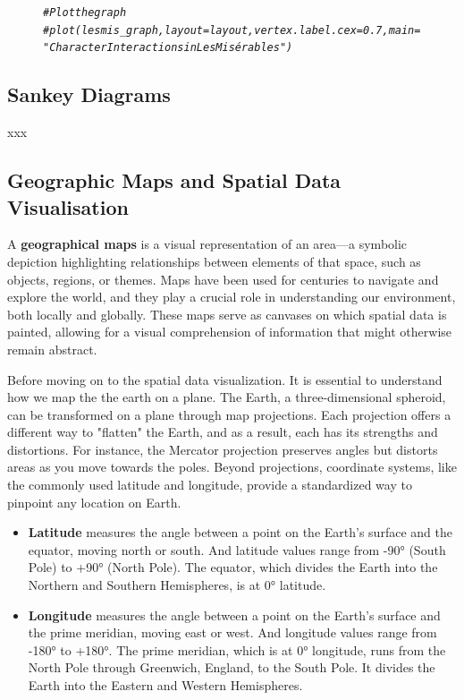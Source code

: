 \documentclass{article}\usepackage[]{graphicx}\usepackage[]{xcolor}
\makeatletter
\newcommand{\hlcom}[1]{\textcolor[rgb]{0.678,0.584,0.686}{\textit{#1}}}%
\newenvironment{kframe}{%
 \def\at@end@of@kframe{}%
 \ifinner\ifhmode%
  \def\at@end@of@kframe{\end{minipage}}%
  \begin{minipage}{\columnwidth}%
 \fi\fi%
 \def\FrameCommand##1{\hskip\@totalleftmargin \hskip-\fboxsep
 \colorbox{shadecolor}{##1}\hskip-\fboxsep
     \hskip-\linewidth \hskip-\@totalleftmargin \hskip\columnwidth}%
 \MakeFramed {\advance\hsize-\width
   \@totalleftmargin\z@ \linewidth\hsize
   \@setminipage}}%
 {\par\unskip\endMakeFramed%
 \at@end@of@kframe}
\newenvironment{knitrout}{}{} %
\makeatother
\begin{document}
\begin{figure}[h]
\centering
\begin{knitrout}\scriptsize
{}\color{fgcolor}\begin{kframe}
\begin{alltt}
\hlcom{# Plot the graph}
\hlcom{#plot(lesmis_graph, layout = layout, vertex.label.cex = 0.7, main = "Character Interactions in Les Misérables")}
\end{alltt}
\end{kframe}
\end{knitrout}
\end{figure}

\subsection{Sankey Diagrams}
xxx

\subsection{Geographic Maps and Spatial Data Visualisation}

A \textbf{geographical maps} is a visual representation of an area—a symbolic depiction highlighting relationships between elements of that space, such as objects, regions, or themes. Maps have been used for centuries to navigate and explore the world, and they play a crucial role in understanding our environment, both locally and globally. These maps serve as canvases on which spatial data is painted, allowing for a visual comprehension of information that might otherwise remain abstract.

Before moving on to the spatial data visualization. It is essential to understand how we map the the earth on a plane. The Earth, a three-dimensional spheroid, can be transformed on a plane through map projections. Each projection offers a different way to "flatten" the Earth, and as a result, each has its strengths and distortions. For instance, the Mercator projection preserves angles but distorts areas as you move towards the poles. Beyond projections, coordinate systems, like the commonly used latitude and longitude, provide a standardized way to pinpoint any location on Earth.

\begin{itemize}
\item \textbf{Latitude} measures the angle between a point on the Earth's surface and the equator, moving north or south. And latitude values range from -90° (South Pole) to +90° (North Pole). The equator, which divides the Earth into the Northern and Southern Hemispheres, is at 0° latitude.
\item \textbf{Longitude} measures the angle between a point on the Earth's surface and the prime meridian, moving east or west.
And longitude values range from -180° to +180°. The prime meridian, which is at 0° longitude, runs from the North Pole through Greenwich, England, to the South Pole. It divides the Earth into the Eastern and Western Hemispheres.
\end{itemize}
\end{document}
